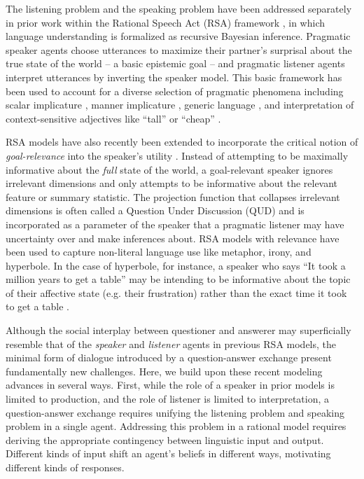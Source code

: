 \documentclass[11pt, floatsintext]{apa6}
\begin{document}
The listening problem and the speaking problem have been addressed separately in prior work within the Rational Speech Act (RSA) framework \cite{FrankGoodman12_PragmaticReasoningLanguageGames, GoodmanStuhlmuller13_KnowledgeImplicature, GoodmanFrank16_RSATiCS}, in which language understanding is formalized as recursive Bayesian inference. 
Pragmatic speaker agents choose utterances to maximize their partner's surprisal about the true state of the world -- a basic epistemic goal -- and pragmatic listener agents interpret utterances by inverting the speaker model. 
This basic framework has been used to account for a diverse selection of pragmatic phenomena including 
scalar implicature \cite{GoodmanStuhlmuller13_KnowledgeImplicature}, 
manner implicature \cite{BergenLevyGoodman16_LexicalUncertainty},
generic language \cite{TesslerGoodman16_Generics}, and
interpretation of context-sensitive adjectives like ``tall'' or ``cheap'' \cite{LassiterGoodman15_AdjectivalVagueness}.

RSA models have also recently been extended to incorporate the critical notion of \emph{goal-relevance} into the speaker's utility \cite{Roberts96_InformationStructureDiscourse, WilsonSperber12_MeaningRelevance}. 
Instead of attempting to be maximally informative about the \emph{full} state of the world, a goal-relevant speaker ignores irrelevant dimensions and only attempts to be informative about the relevant feature or summary statistic. 
The projection function that collapses irrelevant dimensions is often called a Question Under Discussion (QUD) and is incorporated as a parameter of the speaker that a pragmatic listener may have uncertainty over and make inferences about.
RSA models with relevance have been used to capture non-literal language use like metaphor, irony, and hyperbole. 
In the case of hyperbole, for instance, a speaker who says ``It took a million years to get a table'' may be intending to be informative about the topic of their affective state (e.g. their frustration) rather than the exact time it took to get a table \cite{KaoWuBergenGoodman14_NonliteralNumberWords}.

Although the social interplay between questioner and answerer may superficially resemble that of the \emph{speaker} and \emph{listener} agents in previous RSA models, the minimal form of dialogue introduced by a question-answer exchange present fundamentally new challenges.
Here, we build upon these recent modeling advances in several ways. 
First, while the role of a speaker in prior models is limited to production, and the role of listener is limited to interpretation, a question-answer exchange requires unifying the listening problem and speaking problem in a single agent. 
Addressing this problem in a rational model requires deriving the appropriate contingency between linguistic input and output.
Different kinds of input shift an agent's beliefs in different ways, motivating different kinds of responses. 
\end{document}
